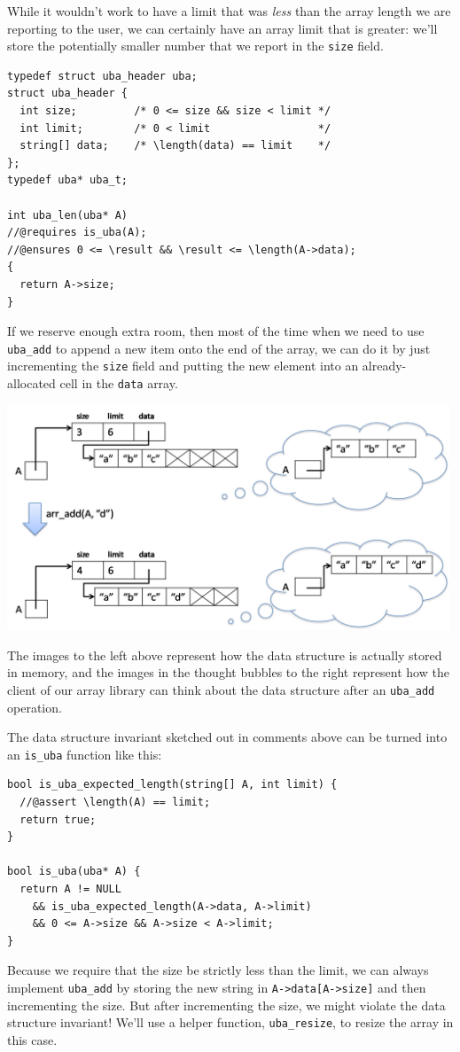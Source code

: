 While it wouldn't work to have a limit that was \emph{less} than the
array length we are reporting to the user, we can certainly have an
array limit that is greater: we'll store the potentially smaller
number that we report in the \lstinline'size' field.
\begin{lstlisting}[language={[C0]C}]
typedef struct uba_header uba;
struct uba_header {
  int size;         /* 0 <= size && size < limit */
  int limit;        /* 0 < limit                 */
  string[] data;    /* \length(data) == limit    */
};
typedef uba* uba_t;

int uba_len(uba* A)
//@requires is_uba(A);
//@ensures 0 <= \result && \result <= \length(A->data);
{
  return A->size;
}
\end{lstlisting}
If we reserve enough extra room, then most of the time when we need to
use \lstinline'uba_add' to append a new item onto the end of the
array, we can do it by just incrementing the \lstinline'size' field
and putting the new element into an already-allocated cell in the
\lstinline'data' array.
\begin{center}
\includegraphics[width=0.99\textwidth]{img/views.png}
\end{center}
The images to the left above represent how the data structure is
actually stored in memory, and the images in the thought bubbles to
the right represent how the client of our array library can think
about the data structure after an \lstinline'uba_add' operation.

The data structure invariant sketched out in comments above can be
turned into an \lstinline'is_uba' function like this:
\begin{lstlisting}[language={[C0]C}]
bool is_uba_expected_length(string[] A, int limit) {
  //@assert \length(A) == limit;
  return true;
}

bool is_uba(uba* A) {
  return A != NULL
    && is_uba_expected_length(A->data, A->limit)
    && 0 <= A->size && A->size < A->limit;
}
\end{lstlisting}
Because we require that the size be strictly less than the limit, we
can always implement \lstinline'uba_add' by storing the new string in
\lstinline'A->data[A->size]' and then incrementing the size. But after
incrementing the size, we might violate the data structure invariant!
We'll use a helper function, \lstinline'uba_resize', to resize the
array in this case.

